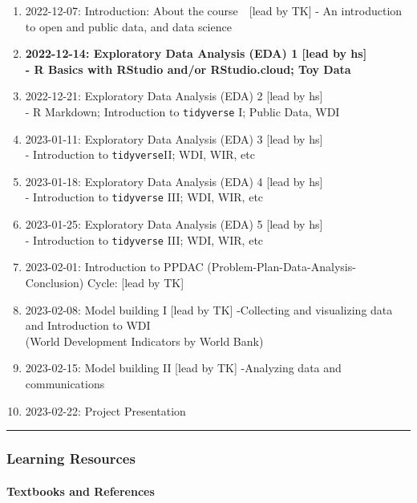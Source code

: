 \documentclass[
]{article}
\providecommand{\tightlist}{%
  \setlength{\itemsep}{0pt}\setlength{\parskip}{0pt}}
\begin{document}
\begin{enumerate}
\def\labelenumi{\arabic{enumi}.}
\tightlist
\item
  2022-12-07: Introduction: About the course　{[}lead by TK{]} - An
  introduction to open and public data, and data science
\item
  \textbf{2022-12-14: Exploratory Data Analysis (EDA) 1 {[}lead by
  hs{]}\\
  - R Basics with RStudio and/or RStudio.cloud; Toy Data}
\item
  2022-12-21: Exploratory Data Analysis (EDA) 2 {[}lead by hs{]}\\
  - R Markdown; Introduction to \texttt{tidyverse} I; Public Data, WDI
\item
  2023-01-11: Exploratory Data Analysis (EDA) 3 {[}lead by hs{]}\\
  - Introduction to \texttt{tidyverse}II; WDI, WIR, etc
\item
  2023-01-18: Exploratory Data Analysis (EDA) 4 {[}lead by hs{]}\\
  - Introduction to \texttt{tidyverse} III; WDI, WIR, etc
\item
  2023-01-25: Exploratory Data Analysis (EDA) 5 {[}lead by hs{]}\\
  - Introduction to \texttt{tidyverse} III; WDI, WIR, etc
\item
  2023-02-01: Introduction to PPDAC
  (Problem-Plan-Data-Analysis-Conclusion) Cycle: {[}lead by TK{]}
\item
  2023-02-08: Model building I {[}lead by TK{]} -Collecting and
  visualizing data and Introduction to WDI\\
  (World Development Indicators by World Bank)
\item
  2023-02-15: Model building II {[}lead by TK{]} -Analyzing data and
  communications
\item
  2023-02-22: Project Presentation
\end{enumerate}

\begin{center}\rule{0.5\linewidth}{0.5pt}\end{center}

\hypertarget{learning-resources}{%
\subsubsection{Learning Resources}\label{learning-resources}}

\hypertarget{textbooks-and-references}{%
\paragraph{Textbooks and References}\label{textbooks-and-references}}
\end{document}
